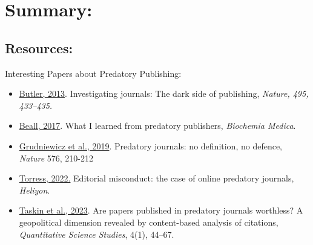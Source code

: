 \documentclass[11pt]{beamer}
\begin{document}
\section{Summary:}
\subsection{Resources:}
\begin{frame}{Interesting Papers about Predatory Publishing:}
\begin{itemize}

    \item {\color{blue}\href{https://www.nature.com/articles/495433a}{Butler, 2013}}. Investigating journals: The dark side of publishing, \textit{Nature, 495, 433–435.}

    \item {\color{blue}\href{https://www.ncbi.nlm.nih.gov/pmc/articles/PMC5493177/}{Beall, 2017}}. What I learned from predatory publishers,  \textit{Biochemia Medica}.

    \item {\color{blue}\href{https://www.nature.com/articles/d41586-019-03759-y}{Grudniewicz et al., 2019}}. Predatory journals: no definition, no defence, \textit{Nature} 576, 210-212

    \item {\color{blue}\href{https://doi.org/10.1016/j.heliyon.2022.e08999}{Torress, 2022.}} Editorial misconduct: the case of online predatory journals,  \textit{Heliyon}.

    \item {\color{blue}\href{https://direct.mit.edu/qss/article/4/1/44/114726/Are-papers-published-in-predatory-journals}{Taskin et al., 2023}}. Are papers published in predatory journals worthless? A geopolitical dimension revealed by content-based analysis of citations, \textit{Quantitative Science Studies}, 4(1), 44–67.
\end{itemize}
\end{frame}
\end{document}
